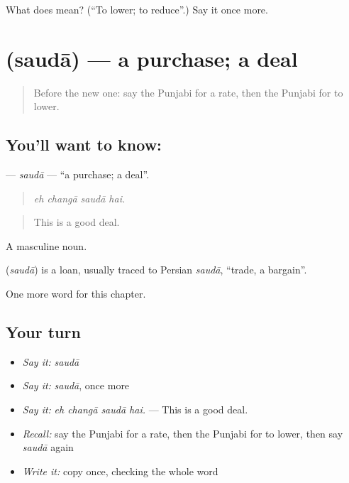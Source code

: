 \begin{tcolorbox}[breakable,colback=teal!4,colframe=teal!35!black,title={Before you move on}]
What does  mean? (\textquotedblleft{}To lower; to reduce\textquotedblright{}.) Say it once more.
\end{tcolorbox}
\section[\texorpdfstring{\pa{ਸੌਦਾ} (saudā)}{ਸੌਦਾ (saudā)}]{ (saudā) — a purchase; a deal}

\label{lesson:PA-C276-sauda}



\begin{quote}
Before the new one: say the Punjabi for a rate, then the Punjabi for to lower.
\end{quote}

\subsection*{You'll want to know: }
\textbf{} — \emph{saudā} — \textquotedblleft{}a purchase; a deal\textquotedblright{}.

\begin{quote}
   
\end{quote}

\begin{quote}
\emph{eh changā saudā hai.}
\end{quote}

\begin{quote}
This is a good deal.
\end{quote}

A masculine noun.

\begin{cousinweb}
\textbf{} (\emph{saudā}) is a loan, usually traced to Persian \emph{saudā}, \textquotedblleft{}trade, a bargain\textquotedblright{}.
\end{cousinweb}

\begin{grammarlens}[title={What you've built}]
One more word for this chapter.
\end{grammarlens}

\subsection*{Your turn}
\begin{itemize}
\raggedright
  \item \emph{Say it:} \emph{saudā}
  \item \emph{Say it:} \emph{saudā}, once more
  \item \emph{Say it:} \emph{eh changā saudā hai.} — This is a good deal.
  \item \emph{Recall:} say the Punjabi for a rate, then the Punjabi for to lower, then say \emph{saudā} again
  \item \emph{Write it:} copy \textbf{} once, checking the whole word
\end{itemize}

